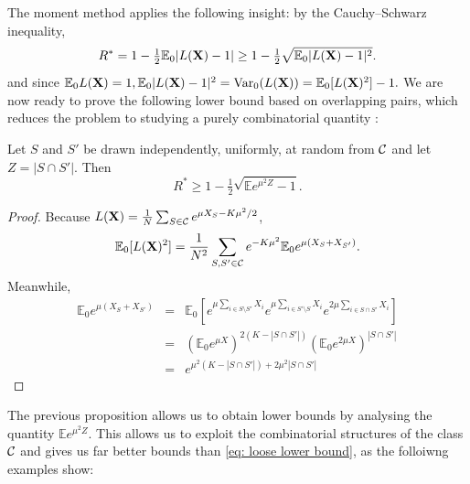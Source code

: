 \documentclass[10pt, oneside]{article}
\begin{document}
The moment method applies the following insight: by the Cauchy--Schwarz inequality,
%
\[
R^* = 1 - \tfrac{1}{2} \mathbb{E}_0 |L(\mathbf{X})-1|
\ge1 - \tfrac{1}{2} \sqrt{\mathbb{E}_0 |L(\mathbf{X})-1|^2}.
\]
and since $\mathbb{E}_0 L(\mathbf{X}) = 1, \mathbb{E}_0 |L(\mathbf{X})-1|^2=\operatorname{Var}_0(L(\mathbf{X})) = \mathbb{E}_0 [L(\mathbf{X})^2] -1.$ 
We are now ready to prove the following lower bound based on overlapping pairs, which reduces the problem to
studying a purely combinatorial quantity \cite{arias2008searching,addario2010combinatorial}:
\begin{prop}
  \label{prop:pairs}
  Let $S$ and $S'$ be drawn independently, uniformly, at random from ${\mathcal C}$
  and let $Z=|S\cap S'|$. Then
  \[
  R^* \ge 1- \tfrac{1}{2} \sqrt{\mathbb{E} e^{\mu^2 Z} -1}.
  \]
\end{prop}
\begin{proof}
Because $L(\mathbf{X})= \frac1 N \sum_{S\in{\mathcal C}} e^{\mu X_S -K\mu^2/2}$, 
\[
\mathbb{E}_0 [L(\mathbf{X})^2]
=
\frac{1}{N^2} \sum_{S,S'\in{\mathcal C}} e^{-K \mu^2} \mathbb{E}_0 e^{\mu(X_S+X_{S'})}.
\]
Meanwhile,
\begin{eqnarray*}
\mathbb{E}_0 e^{\mu(X_S+X_{S'})}
& = &
\mathbb{E}_0 [ e^{\mu\sum_{i\in S\setminus S'} X_i} e^{\mu\sum_{i\in
S'\setminus S} X_i}
e^{2\mu\sum_{i\in S\cap S'} X_i} ] \\
& = &
(\mathbb{E}_0 e^{\mu X} )^{2(K-|S\cap S'|)} (\mathbb{E}_0 e^{2\mu X}
)^{|S\cap S'|}
\\
& = &
e^{\mu^2 (K-|S\cap S'|)+2\mu^2|S\cap S'|}
\end{eqnarray*}
\end{proof}

The previous proposition allows us to obtain lower bounds by analysing the quantity $\mathbb{E} e^{\mu^2Z}$. 
This allows us to exploit the combinatorial structures of the class ${\mathcal C}$ and gives us far better bounds than \ref{eq: loose lower bound}, as the folloiwng examples show:


\end{document}

